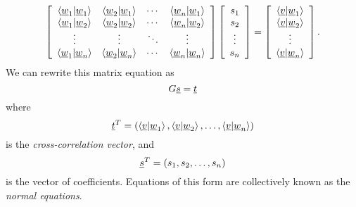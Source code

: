 \begin{equation*}
\left[ \begin{array}{cccc}
\left\langle \underline{w}_1 | \underline{w}_1 \right\rangle
& \left\langle \underline{w}_2 | \underline{w}_1 \right\rangle & \cdots
& \left\langle \underline{w}_n | \underline{w}_1 \right\rangle \\
\left\langle \underline{w}_1 | \underline{w}_2 \right\rangle
& \left\langle \underline{w}_2 | \underline{w}_2 \right\rangle & \cdots
& \left\langle \underline{w}_n | \underline{w}_2 \right\rangle \\
\vdots & \vdots & \ddots & \vdots \\
\left\langle \underline{w}_1 | \underline{w}_n \right\rangle
& \left\langle \underline{w}_2 | \underline{w}_n \right\rangle & \cdots
& \left\langle \underline{w}_n | \underline{w}_n \right\rangle
\end{array} \right]
\left[ \begin{array}{c}
s_1 \\ s_2 \\ \vdots \\ s_n \end{array} \right]
= \left[ \begin{array}{c}
\left\langle \underline{v} | \underline{w}_1 \right\rangle \\
\left\langle \underline{v} | \underline{w}_2 \right\rangle \\ \vdots \\
\left\langle \underline{v} | \underline{w}_n \right\rangle \end{array} \right] .
\end{equation*}
We can rewrite this matrix equation as
\begin{equation*}
G \underline{s} = \underline{t}
\end{equation*}
where
\begin{equation*}
\underline{t}^T = 
\left(
\left\langle \underline{v} | \underline{w}_1 \right\rangle,
\left\langle \underline{v} | \underline{w}_2 \right\rangle, \ldots,
\left\langle \underline{v} | \underline{w}_n \right\rangle \right)
\end{equation*}
is the \emph{cross-correlation vector}, and
\begin{equation*}
\underline{s}^T = 
\left( s_1, s_2, \ldots, s_n \right)
\end{equation*}
is the vector of coefficients.
Equations of this form are collectively known as the \emph{normal equations}.


